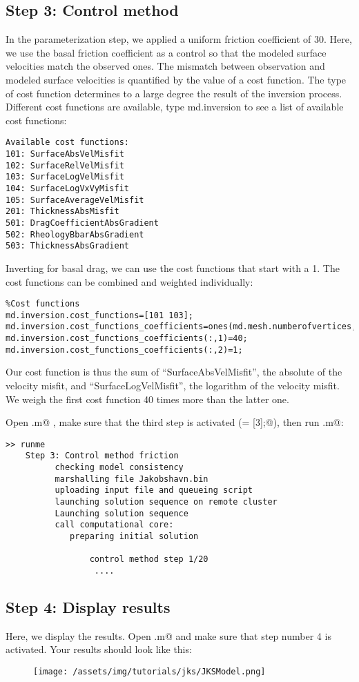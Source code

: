 \subsection{Step 3: Control method}
In the parameterization step, we applied a uniform friction coefficient of 30. Here, we use the basal friction coefficient as a control so that the modeled surface velocities
match the observed ones. The mismatch between observation and modeled surface velocities is quantified by the value of a
cost function. The type of cost function determines to a large degree the result of the inversion process. Different cost functions are available, type md.inversion to see a list of available cost functions:
\begin{verbatim}Available cost functions:
101: SurfaceAbsVelMisfit
102: SurfaceRelVelMisfit
103: SurfaceLogVelMisfit
104: SurfaceLogVxVyMisfit
105: SurfaceAverageVelMisfit
201: ThicknessAbsMisfit
501: DragCoefficientAbsGradient
502: RheologyBbarAbsGradient
503: ThicknessAbsGradient\end{verbatim}
Inverting for basal drag, we can use the cost functions that start with a 1. The cost functions can be combined and weighted individually:
\begin{verbatim}%Cost functions
md.inversion.cost_functions=[101 103];
md.inversion.cost_functions_coefficients=ones(md.mesh.numberofvertices,2);
md.inversion.cost_functions_coefficients(:,1)=40;
md.inversion.cost_functions_coefficients(:,2)=1;\end{verbatim}
Our cost function is thus the sum of ``SurfaceAbsVelMisfit'', the absolute of the velocity misfit, and ``SurfaceLogVelMisfit'', the logarithm of the velocity misfit. We weigh the first cost function 40 times more than the latter one.

Open \verb@runme.m@ , make sure that the third step is activated (\verb@steps = [3];@), then run \verb@runme.m@:
\begin{verbatim}>> runme
	Step 3: Control method friction
		  checking model consistency
		  marshalling file Jakobshavn.bin
		  uploading input file and queueing script
		  launching solution sequence on remote cluster
		  Launching solution sequence
		  call computational core:
		     preparing initial solution

			     control method step 1/20
				  ....\end{verbatim}

\subsection{Step 4: Display results}
Here, we display the results. Open \verb@runme.m@ and make sure that step number 4 is activated. Your results should look like this:
\begin{figure}[H]
	\begin{center}
		\texttt{[image: /assets/img/tutorials/jks/JKSModel.png]}
	\end{center}
\end{figure}
